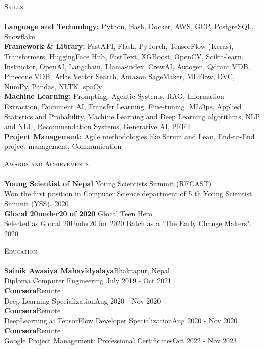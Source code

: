 \documentclass[a4paper]{article}
\newcommand{\lineunder} {
    \vspace*{-8pt} \\
    \hspace*{-18pt} \hrulefill \\
}
\newcommand{\header} [1] {
    {\hspace*{-18pt}\vspace*{6pt} \textsc{#1}}
    \vspace*{-6pt} \lineunder
}
\begin{document}
\header{Skills}
\small{
    \textbf{Language and Technology:}{ Python, Bash, Docker, AWS, GCP, PostgreSQL, Snowflake \\}
    \textbf{Framework \& Library:}{ FastAPI, Flask, PyTorch, TensorFlow (Keras), Transformers, HuggingFace Hub, FastText,
    XGBoost, OpenCV, Scikit-learn, Instructor, OpenAI, Langchain, Llama-index, CrewAI, Autogen, Qdrant VDB, Pinecone VDB, 
    Atlas Vector Search, Amazon SageMaker, MLFlow, DVC, NumPy, Pandas, NLTK, spaCy \\}
    \textbf{Machine Learning:}{ Prompting, Agentic Systems, RAG, Information Extraction, Document AI, Transfer Learning,
    Fine-tuning, MLOps, Applied Statistics and Probability, Machine Learning and Deep Learning algorithms, NLP and NLU,
    Recommendation Systems, Generative AI, PEFT \\}
    \textbf{Project Management:}{ Agile methodologies like Scrum and Lean, End-to-End project management, Communication \\}   
}
\vspace{2mm}

\header{Awards and Achievements}
\textbf{Young Scientist of Nepal} \hfill Young Scientists Summit (RECAST)\\
Won the first position in Computer Science department of 5 th Young Scientist Summit (YSS). \hfill 2020\\
\vspace*{2mm}
\textbf{Glocal 20under20 of 2020} \hfill Glocal Teen Hero\\
Selected as Glocal 20Under20 for 2020 Batch as a "The Early Change Makers". \hfill 2020\\
\vspace*{2mm}

\header{Education}
\textbf{Sainik Awasiya Mahavidyalaya}\hfill Bhaktapur, Nepal\\
Diploma Computer Engineering \hfill July 2019 - Oct 2021\\
\vspace{2mm}
\textbf{Coursera}\hfill Remote\\
Deep Learning Specialization\hfill Aug 2020 - Nov 2020\\
\vspace{2mm}
\textbf{Coursera}\hfill Remote\\
DeepLearning.ai TensorFlow Developer Specialization\hfill Aug 2020 - Nov 2020\\
\vspace{2mm}
\textbf{Coursera}\hfill Remote\\
Google Project Management: Professional Certificates\hfill Oct 2022 - Nov 2023\\
\vspace{4mm}

\ 
\end{document}
